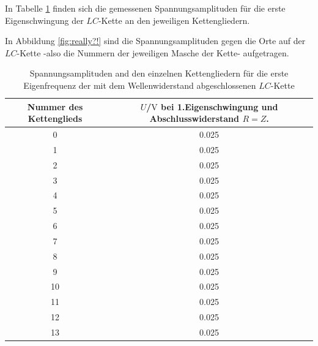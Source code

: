 In Tabelle \ref{tab:lame} finden sich die gemessenen Spannungsamplituden für die erste Eigenschwingung der $LC$-Kette an den jeweiligen Kettengliedern.

In Abbildung \ref{fig:really?!} sind die Spannungsamplituden gegen die Orte auf der $LC$-Kette -also die Nummern der jeweiligen Masche der Kette- aufgetragen.
\begin{table}
	\centering
	\caption{Spannungsamplituden and den einzelnen Kettengliedern für die erste Eigenfrequenz der mit dem Wellenwiderstand abgeschlossenen $LC$-Kette}
	\label{tab:lame}
	\begin{tabular}{cc}
		\toprule
		Nummer des Kettenglieds & $U$/$\si{\volt}$ bei 1.Eigenschwingung und Abschlusswiderstand $R=Z$. \\
		\midrule
		0                       & 0.025                                                                 \\
		1                       & 0.025                                                                 \\
		2                       & 0.025                                                                 \\
		3                       & 0.025                                                                 \\
		4                       & 0.025                                                                 \\
		5                       & 0.025                                                                 \\
		6                       & 0.025                                                                 \\
		7                       & 0.025                                                                 \\
		8                       & 0.025                                                                 \\
		9                       & 0.025                                                                 \\
		10                      & 0.025                                                                 \\
		11                      & 0.025                                                                 \\
		12                      & 0.025                                                                 \\
		13                      & 0.025                                                                 \\
		\bottomrule
	\end{tabular}
\end{table}

